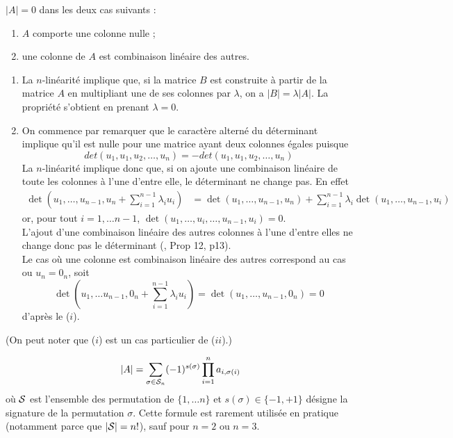 \begin{lemma} \label{lem:determinantNul}
  $|A| = 0$ dans les deux cas suivants :
  \begin{enumerate}[($i$)] 
  \item $A$ comporte une colonne nulle ;
  \item une colonne de $A$ est combinaison linéaire des autres.
  \end{enumerate}
\end{lemma}

\proof 
\begin{enumerate}[($i$)]
\item La $n$-linéarité implique que, si la matrice $B$ est construite à partir de la matrice $A$ en multipliant une de ses colonnes par $\lambda$, on a $|B| = \lambda |A|$. La propriété s'obtient en prenant $\lambda = 0$.
\item On commence par remarquer que le caractère alterné du déterminant implique qu'il est nulle pour une matrice ayant deux colonnes égales puisque
$$
det(u_1, u_1, u_2,\dots, u_n) = -det(u_1, u_1, u_2,\dots, u_n)
$$
La $n$-linéarité implique donc que, si on ajoute une combinaison linéaire de toute les colonnes à l'une d'entre elle, le déterminant ne change pas. En effet
\begin{align*}
  \det\left(u_1, \dots, u_{n-1}, u_n + \sum_{i=1}^{n-1} \lambda_i u_i\right)
  & = \det\left(u_1, \dots, u_{n-1}, u_n\right)
  + \sum_{i=1}^{n-1} \lambda_i \det\left(u_1, \dots, u_{n-1}, u_i\right)
\end{align*}
or, pour tout $i = 1, \dots n-1$, $ \det\left(u_1, \dots, u_i, \dots, u_{n-1}, u_i\right) = 0$. \\
L'ajout d'une combinaison linéaire des autres colonnes à l'une d'entre elles ne change donc pas le déterminant (\cite{GAJ94}, Prop 12, p13). \\
Le cas où une colonne est combinaison linéaire des autres correspond au cas ou $u_n = 0_n$, soit
$$
\det\left(u_1, \dots u_{n-1}, 0_n + \sum_{i=1}^{n-1} \lambda_i u_i\right)
= \det\left(u_1, \dots, u_{n-1}, 0_n\right)
= 0
$$
d'après le ($i$).
\end{enumerate}
(On peut noter que ($i$) est un cas particulier de ($ii$).)
\eproof

\begin{proposition} \label{prop:formuleGeneraleDeterminant}
  \begin{equation} \label{eq:determinant}
    |A| = \sum_{\sigma \in \mathcal{S}_n} (-1)^{s(\sigma)} \prod_{i=1}^n a_{i, \sigma(i)} 
    \end{equation}
    où $\mathcal{S}$ est l'ensemble des permutation de $\{1, \dots n\}$ et $s(\sigma) \in \{-1, +1\}$ désigne la signature de la permutation $\sigma$. Cette formule est rarement utilisée en pratique (notamment parce que $|\mathcal{S}| = n!$), sauf pour $n=2$ ou $n=3$.
\end{proposition}

